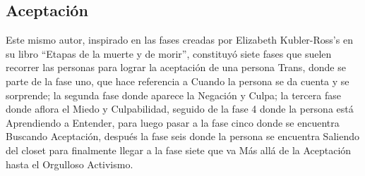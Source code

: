 \subsection{Aceptación}

Este mismo autor, inspirado en las fases creadas por Elizabeth Kubler-Ross's en
su libro “Etapas de la muerte y de morir”, constituyó siete fases que suelen
recorrer las personas para lograr la aceptación de una persona Trans, donde se
parte de la fase uno, que hace referencia a Cuando la persona se da cuenta y se
sorprende; la segunda fase donde aparece la Negación y Culpa; la tercera fase
donde aflora el Miedo y Culpabilidad, seguido de la fase 4 donde la persona está
Aprendiendo a Entender, para luego pasar a la fase cinco donde se encuentra
Buscando Aceptación, después la fase seis donde la persona se encuentra Saliendo
del closet para finalmente llegar a la fase siete que va Más allá de la
Aceptación hasta el Orgulloso Activismo.